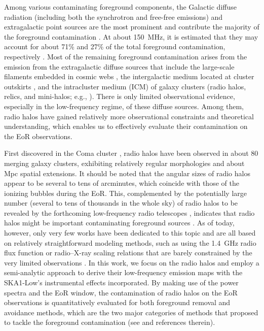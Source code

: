 \documentclass[twocolumn]{aastex62}
\begin{document}
Among various contaminating foreground components, the Galactic diffuse
radiation (including both the synchrotron and free-free emissions)
and extragalactic point sources are the most prominent and contribute
the majority of the foreground contamination \citep[e.g.,][]{%
  shaver1999,diMatteo2004,gleser2008,liu2012,murray2017,spinelli2018}.
At about \SI{150}{\MHz}, it is estimated that they may account for
about 71\% and 27\% of the total foreground
contamination, respectively \citep{shaver1999}.
Most of the remaining foreground contamination arises from the emission
from the extragalactic diffuse sources that include the large-scale
filaments embedded in cosmic webs \citep[e.g.,][]{vazza2015},
the intergalactic medium located at cluster outskirts
\citep[e.g.,][]{keshet2004rev},
and the intracluster medium (ICM) of galaxy clusters (radio halos,
relics, and mini-halos; e.g., \citealt{feretti2012rev}).
There is only limited observational evidence, especially in the
low-frequency regime, of these diffuse sources.
Among them, radio halos have gained relatively more observational
constraints and theoretical understanding, which enables us to
effectively evaluate their contamination on the EoR observations.

First discovered in the Coma cluster \citep{large1959}, radio halos
have been observed in about 80 merging galaxy clusters, exhibiting
relatively regular morphologies and about \si{Mpc} spatial extensions.
It should be noted that the angular sizes of radio halos appear to be
several to tens of arcminutes, which coincide with those of the
ionizing bubbles during the EoR.
This, complemented by the potentially large number (several to tens of
thousands in the whole sky) of radio halos to be revealed by the
forthcoming low-frequency radio telescopes \citep[e.g.,][]{cassano2015},
indicates that radio halos might be important contaminating foreground
sources \citep[e.g.,][]{diMatteo2004,gleser2008}.
As of today, however, only very few works have been dedicated to this
topic and are all based on relatively straightforward modeling methods,
such as using the \SI{1.4}{\GHz} radio flux function or radio--X-ray
scaling relations that are barely constrained by the very limited
observations \citep[e.g.,][]{gleser2008,jelic2008}.
In this work, we focus on the radio halos and employ a semi-analytic
approach to derive their low-frequency emission maps with the SKA1-Low's
instrumental effects incorporated.
By making use of the power spectra and the EoR window, the contamination
of radio halos on the EoR observations is quantitatively evaluated for
both foreground removal and avoidance methods, which are the two major
categories of methods that proposed to tackle the foreground
contamination (see \citealt{chapman2016} and references therein).
\end{document}

